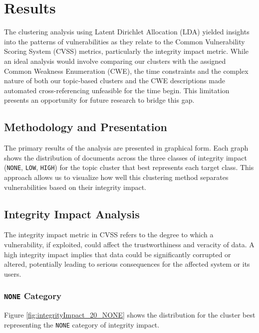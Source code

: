 
\section{Results}

The clustering analysis using Latent Dirichlet Allocation (LDA) yielded insights into the patterns
of vulnerabilities as they relate to the Common Vulnerability Scoring System (CVSS) metrics,
particularly the integrity impact metric. While an ideal analysis would involve comparing our
clusters with the assigned Common Weakness Enumeration (CWE), the time constraints and the complex
nature of both our topic-based clusters and the CWE descriptions made automated cross-referencing
unfeasible for the time begin. This limitation presents an opportunity for future research to bridge this gap.

\subsection{Methodology and Presentation}

The primary results of the analysis are presented in graphical form. Each graph shows the
distribution of documents across the three classes of integrity impact (\texttt{NONE}, \texttt{LOW},
\texttt{HIGH}) for the topic cluster that best represents each target class. This approach allows us
to visualize how well this clustering method separates vulnerabilities based on their integrity impact.

\subsection{Integrity Impact Analysis}

The integrity impact metric in CVSS refers to the degree to which a vulnerability, if exploited, could affect the trustworthiness and veracity of data. A high integrity impact implies that data could be significantly corrupted or altered, potentially leading to serious consequences for the affected system or its users.

\subsubsection{\texttt{NONE} Category}
Figure \ref{fig:integrityImpact_20_NONE} shows the distribution for the cluster best representing the \texttt{NONE} category of integrity impact.

